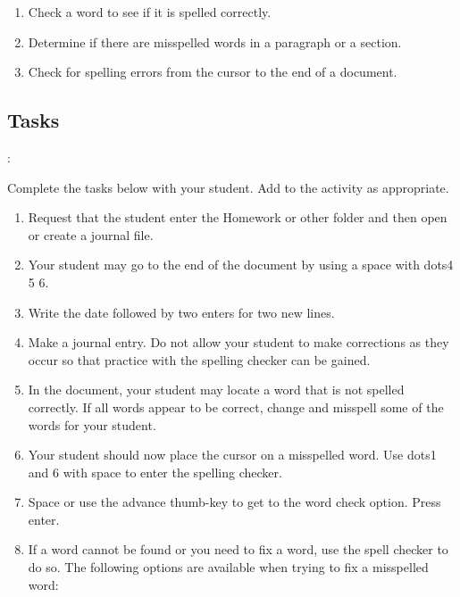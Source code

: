 \documentclass[10pt,letterpaper,twoside]{report}
\begin{document}
{{{{\begin{enumerate}
	\item Check a word to see if it is spelled correctly.
	      
	\item Determine if there are misspelled words in a paragraph or a section.
	      
	\item Check for spelling errors from the cursor to the end of a document.
\end{enumerate}



 \subsection{Tasks}:



Complete the tasks below with your student.  Add to the activity as appropriate.



\begin{enumerate}
	\item Request that the student enter the Homework or other folder and then open or create a journal file.
	      
	\item Your student may go to the end of the document by using a space with dots4 5 6.
	      
	\item Write the date followed by two enters for two new lines.
	      
	\item Make a journal entry.  Do not allow your student to make corrections as they occur so that practice with the spelling checker can be gained.
	      
	\item In the document, your student may locate a word that is not spelled correctly.  If all words appear to be correct, change and misspell some of the words for your student.
	      
	\item Your student should now place the cursor on a misspelled word.  Use dots1 and 6 with space to enter the spelling checker.
	      
	\item Space or use the advance thumb-key to get to the word check option.  Press enter.
	      
	\item If a word cannot be found or you need to fix a word, use the spell checker to do so.  The following options are available when trying to fix a misspelled word:
	      

\end{enumerate}}}}}
\end{document}
